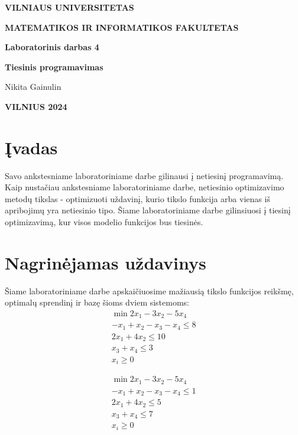 \documentclass{article}
\begin{document}
\newlength{\mywidth}
\settowidth{\mywidth}{Darbo vadovas:}
\begin{titlepage}
    \vskip 20pt
    \centerline{\bf \large VILNIAUS UNIVERSITETAS}
    \bigskip
    \centerline{\large \textbf{MATEMATIKOS IR INFORMATIKOS FAKULTETAS}}
    \vskip 120pt
    \centerline{\bf \Large \textbf{Laboratorinis darbas 4}}
    \vskip 50pt
    \begin{center}
        {\bf \LARGE Tiesinis programavimas}
    \end{center}
    \bigskip
    \bigskip
    \centerline{\Large Nikita Gainulin}
    \vskip 90pt
    \vskip 200pt
    \centerline{\large \textbf{VILNIUS 2024}}
\end{titlepage}

\tableofcontents
\clearpage

\section{Įvadas}
Savo ankstesniame laboratoriniame darbe gilinausi į netiesinį programavimą. Kaip nustačiau ankstesniame laboratoriniame darbe, netiesinio optimizavimo metodų tikslas - optimizuoti uždavinį, kurio tikslo funkcija arba vienas iš apribojimų yra netiesinio tipo. Šiame laboratoriniame darbe gilinsiuosi į tiesinį optimizavimą, kur visos modelio funkcijos bus tiesinės.
\section{Nagrinėjamas uždavinys}
Šiame laboratoriniame darbe apskaičiuosime mažiausią tikslo funkcijos reikšmę, optimalų sprendinį ir bazę šioms dviem sistemoms:
\begin{equation}\label{eq:1}
    \begin{split}
        \min 2x_{1}-3x_{2}-5x_{4} \\
        -x_{1}+x_{2}-x_{3}-x_{4}\leq8\\
        2x_{1}+4x_{2}\leq10\\
        x_{3}+x_{4}\leq3\\
        x_{i}\geq0
    \end{split}
\end{equation}

\begin{equation}\label{eq:2}
    \begin{split}
        \min 2x_{1}-3x_{2}-5x_{4} \\
        -x_{1}+x_{2}-x_{3}-x_{4}\leq1\\
        2x_{1}+4x_{2}\leq5\\
        x_{3}+x_{4}\leq7\\
        x_{i}\geq0
    \end{split}
\end{equation}
\end{document}
